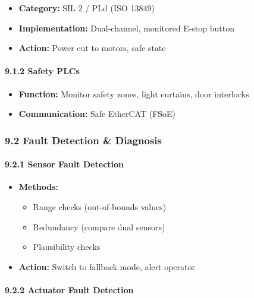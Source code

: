 \documentclass[
]{article}
\providecommand{\tightlist}{%
  \setlength{\itemsep}{0pt}\setlength{\parskip}{0pt}}
\begin{document}
\begin{itemize}
\tightlist
\item
  \textbf{Category:} SIL 2 / PLd (ISO 13849)
\item
  \textbf{Implementation:} Dual-channel, monitored E-stop button
\item
  \textbf{Action:} Power cut to motors, safe state
\end{itemize}

\hypertarget{safety-plcs}{%
\paragraph{9.1.2 Safety PLCs}\label{safety-plcs}}

\begin{itemize}
\tightlist
\item
  \textbf{Function:} Monitor safety zones, light curtains, door
  interlocks
\item
  \textbf{Communication:} Safe EtherCAT (FSoE)
\end{itemize}

\hypertarget{fault-detection-diagnosis}{%
\subsubsection{9.2 Fault Detection \&
Diagnosis}\label{fault-detection-diagnosis}}

\hypertarget{sensor-fault-detection}{%
\paragraph{9.2.1 Sensor Fault Detection}\label{sensor-fault-detection}}

\begin{itemize}
\tightlist
\item
  \textbf{Methods:}

  \begin{itemize}
  \tightlist
  \item
    Range checks (out-of-bounds values)
  \item
    Redundancy (compare dual sensors)
  \item
    Plausibility checks
  \end{itemize}
\item
  \textbf{Action:} Switch to fallback mode, alert operator
\end{itemize}

\hypertarget{actuator-fault-detection}{%
\paragraph{9.2.2 Actuator Fault
Detection}\label{actuator-fault-detection}}
\end{document}

